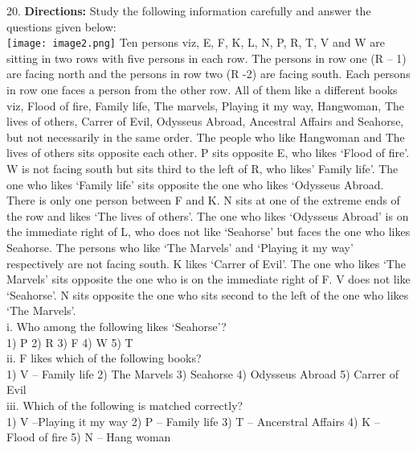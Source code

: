 \documentclass[
]{article}
\begin{document}
20. \textbf{Directions:} Study the following information carefully and answer the questions given
below:\\
\texttt{[image: image2.png]}
Ten persons viz, E, F, K, L, N, P, R, T, V and W are sitting in two rows with five persons in
each row. The persons in row one (R – 1) are facing north and the persons in row two (R -2)
are facing south. Each persons in row one faces a person from the other row. All of them like
a different books viz, Flood of fire, Family life, The marvels, Playing it my way,
Hangwoman, The lives of others, Carrer of Evil, Odysseus Abroad, Ancestral Affairs and
Seahorse, but not necessarily in the same order.
The people who like Hangwoman and The lives of others sits opposite each other. P sits
opposite E, who likes ‘Flood of fire’. W is not facing south but sits third to the left of R, who
likes’ Family life’. The one who likes ‘Family life’ sits opposite the one who likes ‘Odysseus
Abroad. There is only one person between F and K. N sits at one of the extreme ends of the
row and likes ‘The lives of others’. The one who likes ‘Odysseus Abroad’ is on the
immediate right of L, who does not like ‘Seahorse’ but faces the one who likes Seahorse.
The persons who like ‘The Marvels’ and ‘Playing it my way’ respectively are not facing
south. K likes ‘Carrer of Evil’. The one who likes ‘The Marvels’ sits opposite the one who is
on the immediate right of F. V does not like ‘Seahorse’. N sits opposite the one who sits
second to the left of the one who likes ‘The Marvels’.\\

i. Who among the following likes ‘Seahorse’?\\
1) P \hspace{2mm}2) R \hspace{2mm}3) F \hspace{2mm}4) W \hspace{2mm}5) T\\

ii. F likes which of the following books?\\
1) V – Family life \hspace{2mm}2) The Marvels \hspace{2mm}3) Seahorse
\hspace{2mm}4) Odysseus Abroad \hspace{2mm}5) Carrer of Evil\\

iii. Which of the following is matched correctly?\\
1) V –Playing it my way \hspace{2mm}2) P – Family life \hspace{2mm}3) T – Ancerstral
Affairs
\hspace{2mm}4) K – Flood of fire \hspace{2mm}5) N – Hang woman\\
\end{document}
